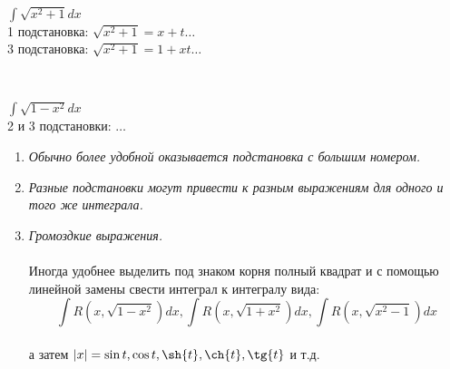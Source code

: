 \begin{example} $\int\sqrt{x^2+1}dx$\\
	1 подстановка: $\sqrt{x^2+1}=x+t\dots$\\
	3 подстановка: $\sqrt{x^2+1}=1+xt\dots$
\end{example}\\
\begin{example} $\int\sqrt{1-x^2}dx$\\
	2 и 3 подстановки: $\dots$
\end{example}
\begin{enumerate}
	\item \textit{Обычно более удобной оказывается подстановка с большим номером.}
	\item \textit{Разные подстановки могут привести к разным выражениям для одного и того же интеграла.}
	\item \textit{Громоздкие выражения.}\\\\
	Иногда удобнее выделить под знаком корня полный квадрат и с помощью линейной замены свести интеграл к интегралу вида:\\
	$$\int R(x, \sqrt{1-x^2})dx, \int R(x, \sqrt{1+x^2})dx, \int R(x, \sqrt{x^2-1})dx$$\\
	а затем $|x|=\sin{t}, \cos{t},\sh{t},\ch{t},\tg{t}$ и т.д.
\end{enumerate}
